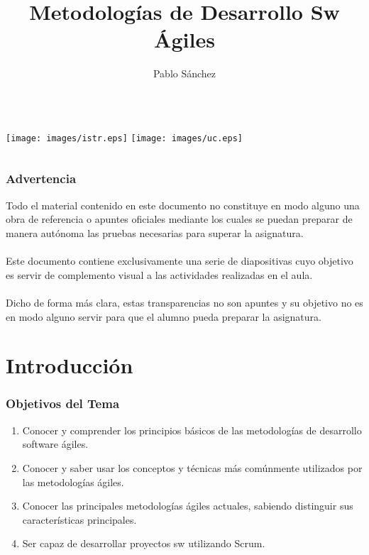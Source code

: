 \documentclass[animated,a4paper,slidestop,xcolor=pst,blue]{beamer}
\title[Metodologías Ágiles]{Metodologías de Desarrollo Sw Ágiles}
\author[P. Sánchez]{\alert{Pablo Sánchez}}
\institute[IIE]{
		   Dpto. Ingeniería Informática y Electrónica \\
		   Universidad de Cantabria \\
		   Santander (Cantabria, España) \\
		   \texttt{p.sanchez@unican.es}
}
\date{}
\begin{document}
\begin{frame}[c]
	\titlepage
	\begin{columns}
			\centering
    		\texttt{[image: images/istr.eps]}
			\centering
			\texttt{[image: images/uc.eps]}
	\end{columns}
\end{frame}

\begin{frame}[c]
    \frametitle{\alert{Advertencia}}
    \begin{center}
        Todo el material contenido en este documento  no constituye en modo alguno una obra de referencia o apuntes oficiales mediante los cuales se puedan preparar de manera autónoma las pruebas necesarias para superar la asignatura. \ \\
        \ \\
        Este documento contiene exclusivamente una serie de diapositivas cuyo objetivo es servir de complemento visual a las actividades realizadas en el aula.  \ \\
        \ \\
        Dicho de forma más clara, \alert{estas transparencias no son apuntes y su objetivo no es en modo alguno servir para que el alumno pueda preparar la asignatura.}
    \end{center}
\end{frame}

\section{Introducción}

\begin{frame}[c]
    \frametitle{Objetivos del Tema}
    \begin{enumerate}[<+->]
         \item Conocer y comprender los principios básicos de las metodologías de desarrollo software ágiles.
         \item Conocer y saber usar los conceptos y técnicas más comúnmente utilizados por las metodologías ágiles.
         \item Conocer las principales metodologías ágiles actuales, sabiendo distinguir sus características principales.
         \item Ser capaz de desarrollar proyectos sw utilizando \alert{Scrum}.
    \end{enumerate}
\end{frame}
\end{document}
